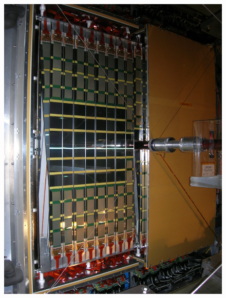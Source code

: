 \begin{frame}
    \begin{figure}[h]
        \centering
        \includegraphics[height=\textheight]{Figures Introductory Lecture/LHCb Detector/LHCb_TT.jpg}%
        \end{figure}
\end{frame}
